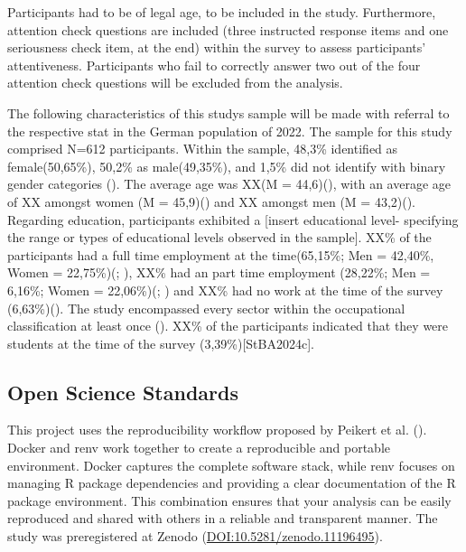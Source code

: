 \documentclass[
  12pt,
  a4paper,
  twoside]{article}
\begin{document}
Participants had to be of legal age, to be included in the study. Furthermore, attention check questions are included (three instructed response items and one seriousness check item, at the end) within the survey to assess participants' attentiveness. Participants who fail to correctly answer two out of the four attention check questions will be excluded from the analysis.

The following characteristics of this studys sample will be made with referral to the respective stat in the German population of 2022.
The sample for this study comprised N=612 participants. Within the sample, 48,3\% identified as female(50,65\%), 50,2\% as male(49,35\%), and 1,5\% did not identify with binary gender categories (). The average age was XX(M = 44,6)(), with an average age of XX amongst women (M = 45,9)() and XX amongst men (M = 43,2)(). Regarding education, participants exhibited a {[}insert educational level- specifying the range or types of educational levels observed in the sample{]}. XX\% of the participants had a full time employment at the time(65,15\%; Men = 42,40\%, Women = 22,75\%)(; ), XX\% had an part time employment (28,22\%; Men = 6,16\%; Women = 22,06\%)(; ) and XX\% had no work at the time of the survey (6,63\%)(). The study encompassed every sector within the occupational classification at least once (). XX\% of the participants indicated that they were students at the time of the survey (3,39\%){[}StBA2024c{]}.

\subsection{Open Science Standards}\label{open-science-standards}

This project uses the reproducibility workflow proposed by Peikert et al. (). Docker and renv work together to create a reproducible and portable environment. Docker captures the complete software stack, while renv focuses on
managing R package dependencies and providing a clear documentation of the R
package environment. This combination ensures that your analysis can be easily
reproduced and shared with others in a reliable and transparent manner.
The study was preregistered at Zenodo (\url{DOI:10.5281/zenodo.11196495}).
\end{document}
